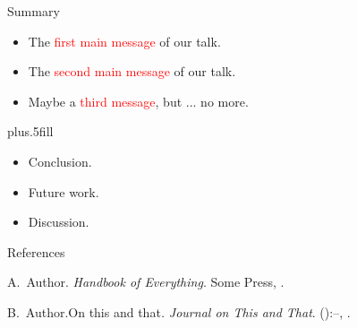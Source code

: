 \documentclass{beamer}
\begin{document}
\begin{frame}{Summary}
\begin{itemize}
	\item The \textcolor{red}{first main message} of our talk.
	\item The \textcolor{red}{second main message} of our talk.
	\item Maybe a \textcolor{red}{third message}, but ... no more.
\end{itemize}
\vskip0pt plus.5fill
\begin{itemize}
	\item Conclusion.
\end{itemize}
\begin{itemize}
	\item Future work.
	\item Discussion.
\end{itemize}
\end{frame}


\begin{frame}{References}
	\begin{thebibliography}{2}
		\beamertemplatebookbibitems
		A.\ Author. \newblock\emph{Handbook of Everything}.\newblock
\textlatin{Some Press, }.

		\beamertemplatearticlebibitems
		B.\ Author.\newblock On this and that\emph{.}
\newblock\emph{Journal on This and That}. 
():--, 
.
	\end{thebibliography}
\end{frame}

\end{document}
